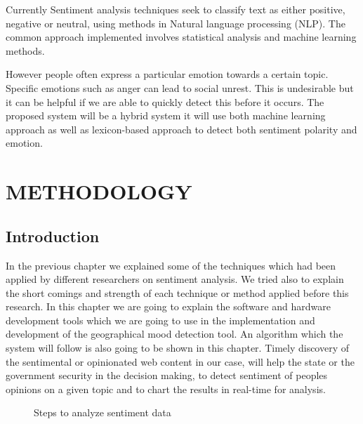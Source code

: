 Currently Sentiment analysis techniques seek to classify text as either positive, negative or neutral, using methods in Natural language processing (NLP). The common approach implemented involves statistical analysis and machine learning methods. \cite{ref2}

%
However people often express a particular emotion towards a certain topic. Specific emotions such as anger can lead to social unrest. This is undesirable but it can be helpful if we are able to quickly detect this before it occurs.
%
The proposed system will be a hybrid system it will use both machine learning approach as well as lexicon-based approach to detect both sentiment polarity and emotion.


\clearpage


\section{METHODOLOGY}
\subsection{Introduction}
In the previous chapter we explained some of the techniques which had been applied by different
researchers on sentiment analysis. We tried also to explain the short comings and
strength of each technique or method applied before this research. In this chapter we are going to
explain the software and hardware development tools which we are going to use in the
implementation and development of the geographical mood detection tool. An algorithm which
the system will follow is also going to be shown in this chapter. Timely discovery of the
sentimental or opinionated web content in our case, will help the state or the government security
in the decision making, to detect sentiment of people\textquotesingle s opinions on a given topic and  to chart the results in real-time for analysis.


\begin{figure}[h]
  \centering
  \caption[Steps to analyze sentiment data]%
  {Steps to analyze sentiment data}
  \label{fig:ALAP:sm1}
\end{figure}




